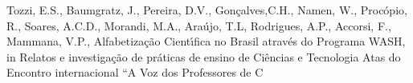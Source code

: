 \documentclass[
12pt,		%
openright,	%
twoside,  %
a4paper,			%
chapter=TITLE,		%
english,			%
french,				%
spanish,			%
brazil				%
]{USPSC-classe/USPSC}
\begin{document}
\begin{flushleft}
\begin{flushleft}
\begin{flushleft}
\begin{flushleft}
\begin{flushleft}
\begin{flushleft}
\begin{flushleft}
\begin{flushleft}
\begin{flushleft}
\begin{flushleft}
\begin{flushleft}
\begin{flushleft}
\begin{flushleft}
\begin{flushleft}
\begin{flushleft}
\begin{flushleft}
\begin{flushleft}
[TOZZI, 2021a] Tozzi, E.S., Baumgratz, J., Pereira, D.V., Gon\c{c}alves,C.H., Namen, W., Proc\'opio, R., Soares, A.C.D., Morandi, M.A., Ara\'ujo, T.L, Rodrigues, A.P., Accorsi, F., Mammana, V.P., Alfabetiza\c{c}\~ao Cient\'{\i}fica no Brasil atrav\'es do Programa WASH, in Relatos e investiga\c{c}\~ao de pr\'aticas de ensino de Ci\^encias e Tecnologia Atas do Encontro internacional “A Voz dos Professores de C
\end{flushleft}


\end{flushleft}


\end{flushleft}


\end{flushleft}


\end{flushleft}


\end{flushleft}


\end{flushleft}


\end{flushleft}


\end{flushleft}


\end{flushleft}


\end{flushleft}


\end{flushleft}


\end{flushleft}


\end{flushleft}


\end{flushleft}


\end{flushleft}


\end{flushleft}
\end{document}
